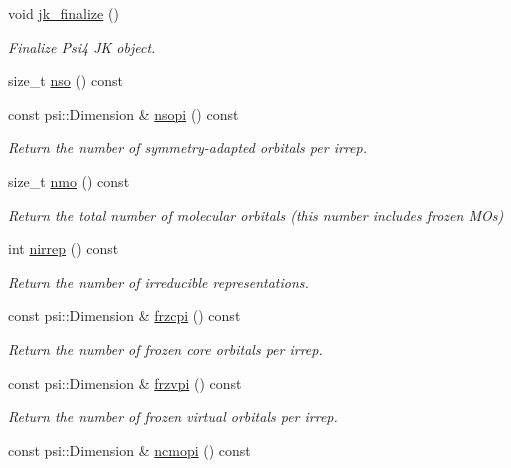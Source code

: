 \begin{DoxyCompactItemize}
void \mbox{\hyperlink{classforte_1_1_forte_integrals_abe3df47d3c7fe30ac090362f20ca5160}{jk\+\_\+finalize}} ()
\begin{DoxyCompactList}\small\item\em Finalize Psi4 JK object. \end{DoxyCompactList}\item 
size\+\_\+t \mbox{\hyperlink{classforte_1_1_forte_integrals_aa008ab25f2c1a11cbe6b7ba43ca6179d}{nso}} () const
\item 
const psi\+::\+Dimension \& \mbox{\hyperlink{classforte_1_1_forte_integrals_afa631a01ad69a803b065734067671704}{nsopi}} () const
\begin{DoxyCompactList}\small\item\em Return the number of symmetry-\/adapted orbitals per irrep. \end{DoxyCompactList}\item 
size\+\_\+t \mbox{\hyperlink{classforte_1_1_forte_integrals_ae1ba804bac41846e3fe915dbab9d57a7}{nmo}} () const
\begin{DoxyCompactList}\small\item\em Return the total number of molecular orbitals (this number includes frozen M\+Os) \end{DoxyCompactList}\item 
int \mbox{\hyperlink{classforte_1_1_forte_integrals_a85f2644fb48f17cfd172682b10a0d252}{nirrep}} () const
\begin{DoxyCompactList}\small\item\em Return the number of irreducible representations. \end{DoxyCompactList}\item 
const psi\+::\+Dimension \& \mbox{\hyperlink{classforte_1_1_forte_integrals_a944cff5a804957677551420b35443a5c}{frzcpi}} () const
\begin{DoxyCompactList}\small\item\em Return the number of frozen core orbitals per irrep. \end{DoxyCompactList}\item 
const psi\+::\+Dimension \& \mbox{\hyperlink{classforte_1_1_forte_integrals_a9ec81966b5288931a2116e6f2f34a85d}{frzvpi}} () const
\begin{DoxyCompactList}\small\item\em Return the number of frozen virtual orbitals per irrep. \end{DoxyCompactList}\item 
const psi\+::\+Dimension \& \mbox{\hyperlink{classforte_1_1_forte_integrals_a95947448d8e40f2be497e613512e64eb}{ncmopi}} () const

\end{DoxyCompactItemize}
